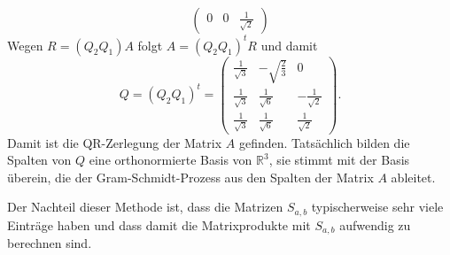 \begin{beispiel}
\[\begin{pmatrix}
    0    &         0          & \frac{1}{\sqrt{2}}
\end{pmatrix}
\]
Wegen $R=(Q_2Q_1)A$ folgt $A=(Q_2Q_1)^t R$ und damit
\[
Q=(Q_2Q_1)^t
=
\begin{pmatrix}
\frac{1}{\sqrt{3}} & - \sqrt{\frac{2}{3}} & 0\\
\frac{1}{\sqrt{3}} & \frac{1}{\sqrt{6}}   & - \frac{1}{\sqrt{2}} \\
\frac{1}{\sqrt{3}} & \frac{1}{\sqrt{6}}   & \frac{1}{\sqrt{2}}
\end{pmatrix}.
\]
Damit ist die QR-Zerlegung der Matrix $A$ gefinden.
Tatsächlich bilden die Spalten von $Q$ eine orthonormierte Basis
von $\mathbb R^3$, sie stimmt mit der Basis überein, die der
Gram-Schmidt-Prozess aus den Spalten der Matrix $A$ ableitet.
\end{beispiel}

Der Nachteil dieser Methode ist, dass die Matrizen $S_{a,b}$ typischerweise
sehr viele Einträge haben und dass damit die Matrixprodukte mit $S_{a,b}$
aufwendig zu berechnen sind.

